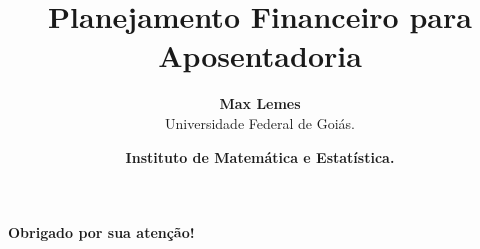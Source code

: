 \documentclass[aspectratio=1610,12pt]{beamer} %
\title
  {Planejamento Financeiro para Aposentadoria}
\author[Max Lemes]
  {
   \textbf{Max Lemes} \\
   Universidade Federal de Goiás.
  }
\date
  {
    \textcolor{UFGorange}{\textbf{Instituto de Matemática e Estatística.}}\\
  }
\begin{document}
\maketitle





\begin{frame}[c]\frametitle{}
  \begin{center}
    \LARGE \textcolor{UFGblue}{\textbf{Obrigado por sua atenção!}}
  \end{center}
\end{frame}
\end{document}
